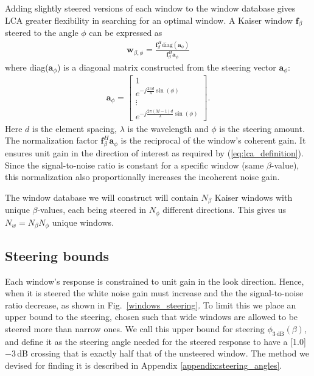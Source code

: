\documentclass[10pt,journal,draftclsnofoot,onecolumn]{IEEEtran}
\newcommand\Fig[1]{Fig.~\ref{#1}}
\newcommand\bmat[1]{\begin{bmatrix}#1\end{bmatrix}}
\newcommand\diag{\text{diag}}
\renewcommand\H{^{\scriptscriptstyle H}}
\renewcommand\vec[1]{\boldsymbol{#1}}
\newcommand\1{\vec 1}
\renewcommand*\a{\vec a}
\newcommand*\f{\vec f}
\newcommand*\w{\vec w}
\newcommand\minus{\scalebox{0.75}[1.0]{$-$}}
\providecommand{\DIFadd}[1]{{\protect\color{blue}\uwave{#1}}} %
\providecommand{\DIFaddbegin}{} %
\providecommand{\DIFaddend}{} %
\begin{document}
Adding slightly steered versions of each window to the window database gives LCA greater flexibility in searching for an optimal window. A Kaiser window $\f_\beta$ steered to the \DIFaddbegin \DIFadd{azimuth }\DIFaddend angle $\phi$ can be expressed as 
%
\begin{align}
\w_{\beta,\phi} = \frac{\f_\beta\H\diag{(\a_\phi)}}{\f_\beta\H\a_\phi}\label{eq:steered_window}
\end{align}
%
where diag($\a_\phi$) is a diagonal matrix constructed from the steering vector $\a_\phi$:
%
\begin{align}
\a_\phi = \bmat{
1 \\
e^{-j\frac{2\pi d}{\lambda}\sin(\phi)} \\
\vdots\\
e^{-j\frac{2\pi (M-1)d}{\lambda}\sin(\phi)}
}.\label{eq:steering_vector}
\end{align}
%
Here $d$ is the element spacing, $\lambda$ is the wavelength and $\phi$ is the steering amount. The normalization factor $\f_\beta\H\a_\phi$ is the reciprocal of the window's coherent gain. It ensures unit gain in the direction of interest as required by (\ref{eq:lca_definition}). Since the signal-to-noise ratio is constant for a specific window (same $\beta$-value), this normalization also proportionally increases the incoherent noise gain.

The window database we will construct will contain $N_\beta$ Kaiser windows with unique $\beta$-values, each being steered in $N_\phi$ different directions. This gives us $N_w = N_\beta N_\phi$ unique windows.


\subsection{Steering bounds}\label{sec:lca_steering_bounds}

Each window's \DIFaddbegin \DIFadd{spatial }\DIFaddend response is constrained to unit gain in the look direction. Hence, when it is steered the white noise gain must increase and the the signal-to-noise ratio decrease, as shown in \Fig{windows_steering}. To limit this we place an upper bound to the steering, chosen such that wide windows are allowed to be steered more than narrow ones. We call this upper bound for steering $\phi_{\mathrm{3\,dB}}(\beta)$, and define it as the steering angle needed for the steered \DIFaddbegin \DIFadd{amplitude }\DIFaddend response to have a \minus{}3\,dB crossing that is exactly half that of the unsteered window. The method we devised for finding it is described in Appendix \ref{appendix:steering_angles}. 
\end{document}
